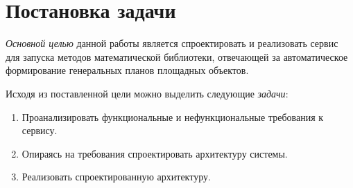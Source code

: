 \section*{\Large{Постановка задачи}}

\textit{Основной целью} данной работы является спроектировать и реализовать сервис для запуска методов
математической библиотеки, отвечающей за автоматическое формирование генеральных планов площадных объектов.

Исходя из поставленной цели можно выделить следующие \textit{задачи}:
\begin{enumerate}
    \item Проанализировать функциональные и нефункциональные требования к сервису.
    \item Опираясь на требования спроектировать архитектуру системы.
    \item Реализовать спроектированную архитектуру.
\end{enumerate}
